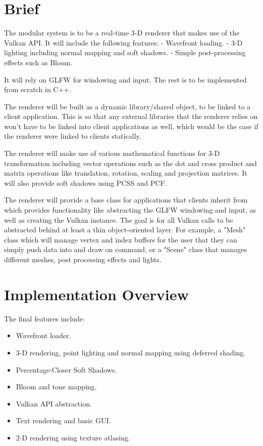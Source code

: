 \documentclass[8pt]{article}
\begin{document}
		\begin{multicols}{2}
			\section{Brief}
			The modular system is to be a real-time 3-D renderer that makes use
			of the Vulkan API. It will include the following features: -
			Wavefront loading.  - 3-D lighting including normal mapping and
			soft shadows.  - Simple post-processing effects such as Bloom.

			It will rely on GLFW for windowing and input. The rest is to be
			implemented from scratch in C++.

			The renderer will be built as a dynamic library/shared object, to
			be linked to a client application. This is so that any external
			libraries that the renderer relies on won't have to be linked into
			client applications as well, which would be the case if the
			renderer were linked to clients statically.

			The renderer will make use of various mathematical functions for
			3-D transformation including vector operations such as the dot and
			cross product and matrix operations like translation, rotation,
			scaling and projection matrices. It will also provide soft shadows
			using PCSS and PCF.

			The renderer will provide a base class for applications that
			clients inherit from which provides functionality like abstracting
			the GLFW windowing and input, as well as creating the Vulkan
			instance. The goal is for all Vulkan calls to be abstracted behind
			at least a thin object-oriented layer. For example, a "Mesh" class
			which will manage vertex and index buffers for the user that they
			can simply push data into and draw on command, or a "Scene" class
			that manages different meshes, post processing effects and lights.

			\section{Implementation Overview}
				The final features include:
				\begin{itemize}
					\item Wavefront loader.
					\item 3-D rendering, point lighting and normal mapping using deferred shading.
					\item Percentage-Closer Soft Shadows.
					\item Bloom and tone mapping.
					\item Vulkan API abstraction.
					\item Text rendering and basic GUI.
					\item 2-D rendering using texture atlasing.
				\end{itemize}


\end{multicols}
\end{document}
